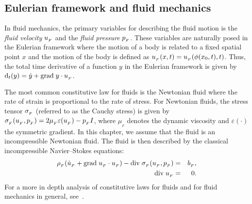 \subsection{Eulerian framework and fluid mechanics}
\label{selim:sec:fluid}
In fluid mechanics, the primary variables for describing the fluid
motion is the \emph{fluid velocity} $u_{_{F}}$ and the \emph{fluid
  pressure} $p_{_{F}}$. These variables are naturally posed in the Eulerian
framework where the motion of a body is related to a fixed spatial
point $x$ and the motion of the body is defined as $u_{_{F}}(x,t) =
u_{_{F}}(\phi(x_0,t),t)$. Thus, the total time derivative of a function $y$
in the Eulerian framework is given by $\textrm{d}_t(y) = \dot{y} +
\textrm{grad}\;y\cdot u_{_{F}}$.

The most common constitutive law for fluids is the Newtonian fluid
where the rate of strain is proportional to the rate of stress. For
Newtonian fluids, the stress tensor $\sigma_{_{F}}$ (referred to as the
Cauchy stress) is given by $\sigma_{_{F}}(u_{_{F}}, p_{_{F}}) = 2\mu_{_{F}}\varepsilon (u_{_{F}}) -
p_{_{F}} I$, where $\mu_{_{F}}$ denotes the dynamic viscosity and
$\varepsilon(\cdot)$ the symmetric gradient. In this chapter, we
assume that the fluid is an incompressible Newtonian fluid. The fluid
is then described by the classical incompressible Navier--Stokes
equations:
\begin{eqnarray}
  \label{selim:eq:NSmom}
      \rho_{_{F}}(\dot{u}_{_{F}} + \textrm{grad}\;u_{_{F}}\cdot u_{_{F}})- \textrm{div}\;
      \sigma_{_{F}}(u_{_{F}}, p_{_{F}}) &=& b_{_{F}},\\
  \label{selim:eq:NScon}
      \textrm{div}\; u_{_{F}} &=& 0.
\end{eqnarray}
For a more in depth analysis of constitutive laws for fluids and for
fluid mechanics in general, see~\cite{Batchelor1967,Panton1984,
  WeltyWicksWilson2001}.

